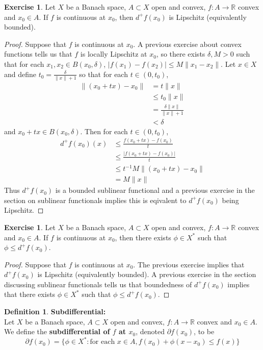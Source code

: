 \documentclass[12pt]{amsart}
\theoremstyle{definition}
\newtheorem{defn}[definition]{Definition}
\theoremstyle{remark}
\theoremstyle{definition}
\newtheorem{ex}[definition]{Exercise}
\newcommand{\del}{\delta}
\newcommand{\R}{\mathbb{R}}
\newcommand{\p}{\partial}
\begin{document}
	\begin{ex}
	Let $X$ be a Banach space, $A \subset X$ open and convex, $f:A \rightarrow \R$ convex and $x_0 \in A$. If $f$ is continuous at $x_0$, then $d^+f(x_0)$ is Lipschitz (equivalently bounded). 
	\end{ex}	
	
	\begin{proof}
	Suppose that $f$ is continuous at $x_0$. A previous exercise about convex functions tells us that $f$ is locally Lipschitz at $x_0$, so there exists $\del,M >0$ such that for each $x_1, x_2 \in B(x_0, \del)$, $|f(x_1) - f(x_2)| \leq M\|x_1 - x_2\|$. Let $x \in X$ and define $t_0 = \frac{\del}{\|x\| + 1}$ so that for each $t \in (0, t_0)$,
	\begin{align*}
	\|(x_0 +tx) - x_0\|
	& = t\|x\| \\
	& \leq t_0 \| x\| \\
	&= \frac{\del \| x\|}{\|x\| + 1} \\
	& < \del
	\end{align*}  
	and $x_0 +tx \in B(x_0, \del)$.
	Then for each $t \in (0, t_0)$, 
	\begin{align*}
	d^+f(x_0)(x) 
	& \leq \frac{f(x_0 + tx) - f(x_0)}{t} \\
	& \leq \frac{|f(x_0 + tx) - f(x_0)|}{t} \\
	& \leq t^{-1}M \| (x_0 + tx) - x_0\| \\
	&= M\|x\|
	\end{align*}
	Thus $d^+f(x_0)$ is a bounded sublinear functional and  a previous exercise in the section on sublinear functionals implies this is eqivalent to $d^+f(x_0)$ being Lipschitz.
	\end{proof}
	
	\begin{ex}
	Let $X$ be a Banach space, $A \subset X$ open and convex, $f:A \rightarrow \R$ convex and $x_0 \in A$. If $f$ is continuous at $x_0$, then there exists $\phi \in X^*$ such that $\phi \leq d^+f(x_0)$.
	\end{ex}	
	
	\begin{proof}
	Suppose that $f$ is continuous at $x_0$. The previous exercise implies that $d^+f(x_0)$ is Lipschitz (equivalently bounded). A previous exercise in the section discussing sublinear functionals tells us that boundedness of $d^+f(x_0)$ implies that there exists $\phi \in X^*$ such that $\phi \leq d^+f(x_0)$.
	\end{proof}
	
	\begin{defn}\textbf{Subdifferential:}\\
	Let $X$ be a Banach space, $A \subset X$ open and convex, $f:A \rightarrow \R$ convex and $x_0 \in A$. We define the \textbf{subdifferential of $f$ at $x_0$}, denoted $\p f(x_0)$, to be $$\p f(x_0) = \{ \phi \in X^*: \text{for each } x \in A, f(x_0) + \phi(x-x_0) \leq f(x)\}$$
	\end{defn}
	
\end{document}
